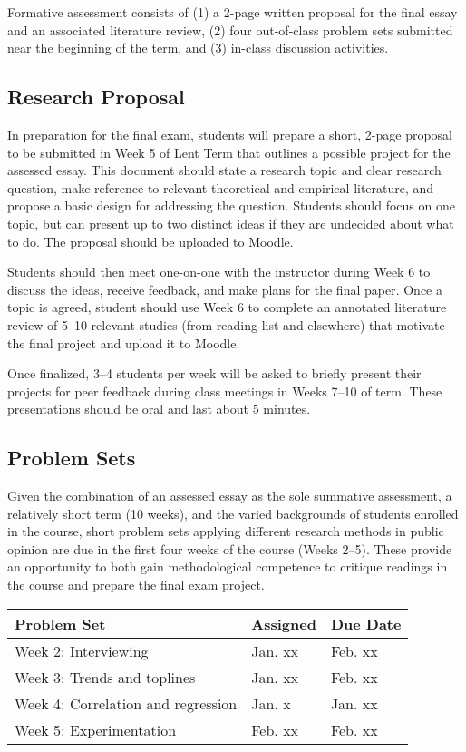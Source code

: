 \documentclass[12pt,a4paper]{article}
\begin{document}
Formative assessment consists of (1) a 2-page written proposal for the final essay and an associated literature review, (2) four out-of-class problem sets submitted near the beginning of the term, and (3) in-class discussion activities.

\subsection{Research Proposal}

In preparation for the final exam, students will prepare a short, 2-page proposal to be submitted in Week 5 of Lent Term that outlines a possible project for the assessed essay. This document should state a research topic and clear research question, make reference to relevant theoretical and empirical literature, and propose a basic design for addressing the question. Students should focus on one topic, but can present up to two distinct ideas if they are undecided about what to do. The proposal should be uploaded to Moodle.

Students should then meet one-on-one with the instructor during Week 6 to discuss the ideas, receive feedback, and make plans for the final paper. Once a topic is agreed, student should use Week 6 to complete an annotated literature review of 5--10 relevant studies (from reading list and elsewhere) that motivate the final project and upload it to Moodle.

Once finalized, 3--4 students per week will be asked to briefly present their projects for peer feedback during class meetings in Weeks 7--10 of term. These presentations should be oral and last about 5 minutes.

\subsection{Problem Sets}

Given the combination of an assessed essay as the sole summative assessment, a relatively short term (10 weeks), and the varied backgrounds of students enrolled in the course, short problem sets applying different research methods in public opinion are due in the first four weeks of the course (Weeks 2--5). These provide an opportunity to both gain methodological competence to critique readings in the course and prepare the final exam project.

\begin{center}
\begin{tabular}{lll} \hline
\textbf{Problem Set} & \textbf{Assigned} & \textbf{Due Date} \\ \hline
Week 2: Interviewing & Jan. xx & Feb. xx \\
Week 3: Trends and toplines & Jan. xx & Feb. xx \\
Week 4: Correlation and regression & Jan. x & Jan. xx \\
Week 5: Experimentation & Feb. xx & Feb. xx \\ \hline
\end{tabular}
\end{center}
\end{document}
